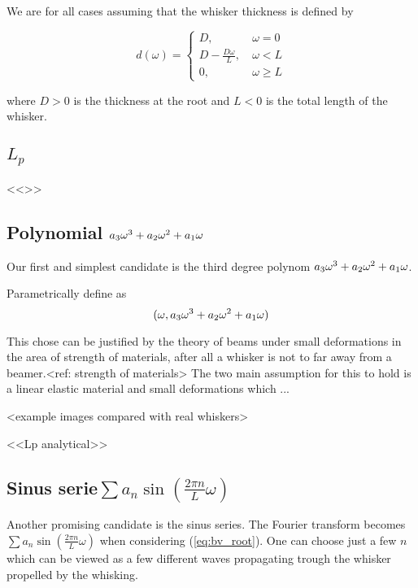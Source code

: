 We are for all cases assuming that the whisker thickness is defined by

\begin{equation}
    d(\omega) = \begin{cases}
        D,~& \omega=0\\
        D-\frac{D\omega}{L},~& \omega<L\\
        0,~& \omega\ge L
    \end{cases}
\end{equation}

where $D>0$ is the thickness at the root and $L<0$ is the total length of the
whisker.


\subsection{$L_p$}
    <<>>

\subsection{Polynomial $a_3\omega^3+a_2\omega^2+a_1\omega$}

    Our first and simplest candidate is the third degree polynom $a_3\omega^3+a_2\omega^2+a_1\omega$.

    Parametrically define as
    \begin{equation}
        (\omega,a_3\omega^3+a_2\omega^2+a_1\omega)
    \end{equation}

    This chose can be justified by the theory of beams under small deformations 
    in the area of strength of materials, after all a whisker is not to far 
    away from a beamer.<ref: strength of materials> The two main assumption
    for this to hold is a linear elastic material and small deformations which
    ...

    <example images compared with real whiskers>

    <<Lp analytical>>

\subsection{Sinus serie$\sum{a_n\sin (\frac{2\pi n}{L}\omega)}$}
    Another promising candidate is the sinus series.
    The Fourier transform becomes $\sum{a_n\sin (\frac{2\pi n}{L}\omega)}$ when
    considering (\ref{eq:bv_root}). One can choose just a few $n$ which can be
    viewed as a few different waves propagating trough the whisker propelled by
    the whisking. 

